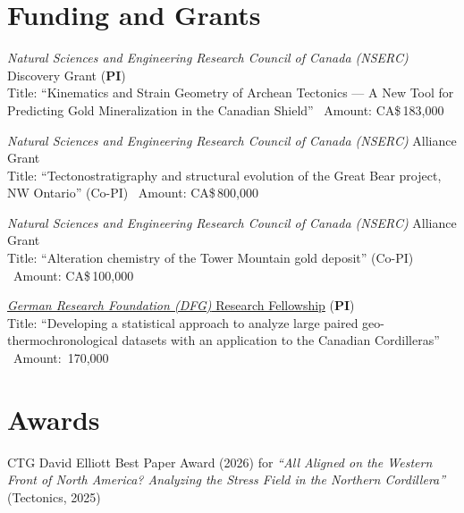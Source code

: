 \documentclass[10pt, paper=letter]{scrartcl} %
\begin{document}
\begin{cv}{}
    \section{Funding and Grants}
    \begin{cvlist}{}
        \item[2026--2031] \textit{Natural Sciences and Engineering Research Council of Canada (NSERC)}  Discovery Grant (\textbf{PI})\\
        Title: \enquote{Kinematics and Strain Geometry of Archean Tectonics --- A New Tool for Predicting Gold Mineralization in the Canadian Shield} \textbar\
        Amount: CA\$\,183,000
        \item[2026--2031] \textit{Natural Sciences and Engineering Research Council of Canada (NSERC)} Alliance Grant\\
        Title: \enquote{Tectonostratigraphy and structural evolution of the Great Bear project, NW Ontario} (Co-PI) \textbar\
        Amount: CA\$\,800,000
        \item[2026--2028] \textit{Natural Sciences and Engineering Research Council of Canada (NSERC)} Alliance Grant\\
        Title: \enquote{Alteration chemistry of the Tower Mountain gold deposit} (Co-PI) \textbar\
        Amount: CA\$\,100,000
        \item[2020--2022]
        \href{https://gepris.dfg.de/gepris/projekt/439621066?language=en}{\textit{German Research Foundation (DFG)} Research
            Fellowship} (\textbf{PI})\\
            Title: \enquote{Developing a statistical approach to analyze large paired geo-thermochronological datasets with an application to the Canadian Cordilleras} \textbar\
            Amount: \texteuro\,170{,}000
    \end{cvlist}

    \section{Awards}
    \begin{cvlist}{}
        \item[2026] CTG David Elliott Best Paper Award (2026) for \textit{\enquote{All Aligned on the Western Front of North America? Analyzing the Stress Field in the Northern Cordillera}} (Tectonics, 2025)
    \end{cvlist}
    

\end{cv}
\end{document}
